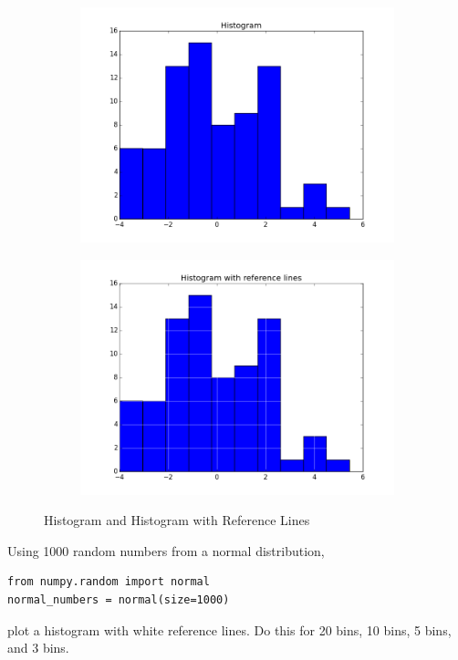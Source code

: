 \begin{figure}
\centering
\begin{subfigure}{.45\textwidth}
\centering
\includegraphics[width=\textwidth]{histogram.png}
\end{subfigure}
\centering
\begin{subfigure}{.45\textwidth}
\centering
\includegraphics[width=\textwidth]{histogram_referenceLines.png}
\end{subfigure}
\caption{Histogram and Histogram with Reference Lines}
\label{fig:histogram}
\end{figure}



\begin{problem}
Using 1000 random numbers from a normal distribution,
\begin{lstlisting}
from numpy.random import normal
normal_numbers = normal(size=1000)
\end{lstlisting}
plot a histogram with white reference lines.  Do this for 20 bins, 10 bins, 5 bins, and 3 bins.

\end{problem}


